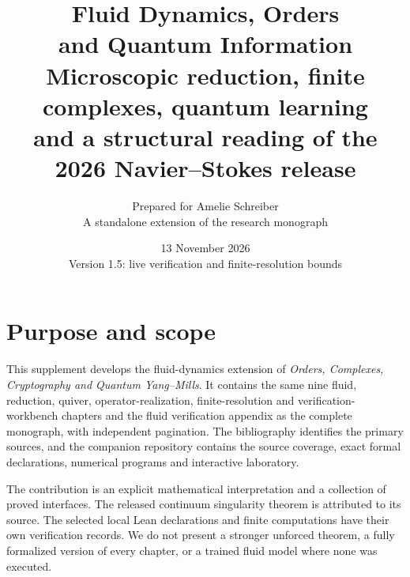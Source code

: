 \documentclass[11pt,oneside,openany]{book}
\title{\textbf{Fluid Dynamics, Orders\\and Quantum Information}\\[1em]\Large Microscopic reduction, finite complexes, quantum learning\\and a structural reading of the 2026 Navier--Stokes release}
\author{Prepared for Amelie Schreiber\\[.4em]\normalsize A standalone extension of the research monograph}
\date{13 November 2026\\\small Version 1.5: live verification and finite-resolution bounds}
\theoremstyle{definition}
\theoremstyle{remark}
\begin{document}
\frontmatter
\hypersetup{pageanchor=false}
\maketitle
\clearpage
\hypersetup{pageanchor=true}
\chapter*{Purpose and scope}
This supplement develops the fluid-dynamics extension of \emph{Orders, Complexes, Cryptography and Quantum Yang--Mills}. It contains the same nine fluid, reduction, quiver, operator-realization, finite-resolution and verification-workbench chapters and the fluid verification appendix as the complete monograph, with independent pagination. The bibliography identifies the primary sources, and the companion repository contains the source coverage, exact formal declarations, numerical programs and interactive laboratory.

The contribution is an explicit mathematical interpretation and a collection of proved interfaces. The released continuum singularity theorem is attributed to its source. The selected local Lean declarations and finite computations have their own verification records. We do not present a stronger unforced theorem, a fully formalized version of every chapter, or a trained fluid model where none was executed.
\tableofcontents
\mainmatter









\appendix

\backmatter


\end{document}
